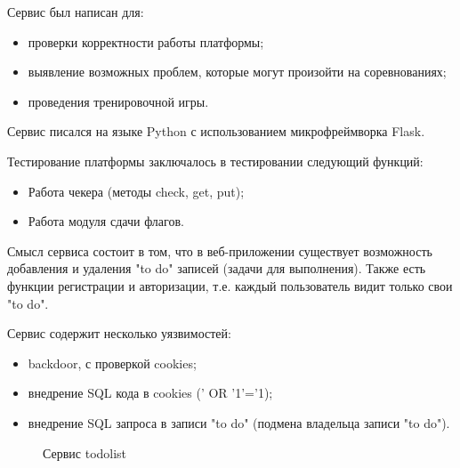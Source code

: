 Сервис был написан для:
\begin{itemize} 
\item проверки корректности работы платформы;
\item выявление возможных проблем, которые могут произойти на соревнованиях;
\item проведения тренировочной игры.
\end{itemize}

Сервис писался на языке Python с использованием микрофреймворка Flask.

Тестирование платформы заключалось в тестировании следующий функций:
\begin{itemize} 
\item Работа чекера (методы check, get, put);
\item Работа модуля сдачи флагов.
\end{itemize}

Смысл сервиса состоит в том, что в веб-приложении существует возможность добавления и удаления "to do" записей (задачи для выполнения). Также есть функции регистрации и авторизации, т.е. каждый пользователь видит только свои "to do".

Сервис содержит несколько уязвимостей:
\begin{itemize} 
\item backdoor, с проверкой cookies;
\item внедрение SQL кода в cookies (' OR '1'='1);
\item внедрение SQL запроса в записи "to do" (подмена владельца записи "to do").
\end{itemize}

\begin{figure}[ht!]
\caption{Сервис todolist}
\end{figure}
